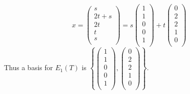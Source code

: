 \documentclass{eh-homework}
\begin{document}
\begin{question}{2}
\begin{enumerate}[label=(\alph*)]
        \[
            x = \begin{pmatrix}
                s  \\
                2t + s  \\
                2t  \\
                t  \\
                s  \\
            \end{pmatrix} = 
            s \begin{pmatrix}
                 1 \\
                 1 \\
                 0 \\
                 0 \\
                 1 \\
            \end{pmatrix} +
            t \begin{pmatrix}
                 0 \\
                 2 \\
                 2 \\
                 1 \\
                 0 \\
            \end{pmatrix}
        \]
        Thus a basis for \(E_1(T)\) is \(\left\{ \begin{pmatrix}
            1 \\
            1 \\
            0 \\
            0 \\
            1 \\
       \end{pmatrix},\begin{pmatrix}
            0 \\
            2 \\
            2 \\
            1 \\
            0 \\
        \end{pmatrix} \right\} \).

        \medskip


\end{enumerate}
\end{question}
\end{document}
